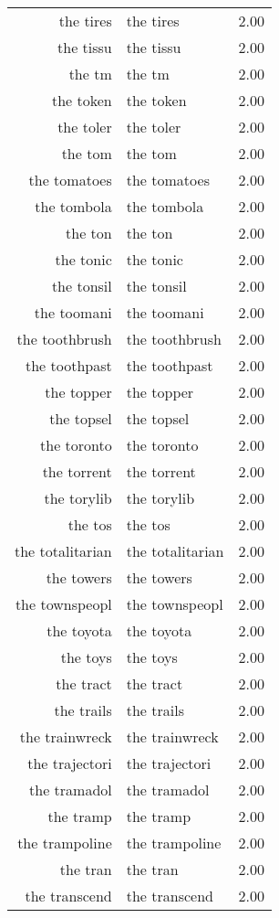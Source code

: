 \begin{table}[ht]
\begin{tabular}{rlr}
  the tires & the tires & 2.00 \\ 
  the tissu & the tissu & 2.00 \\ 
  the tm & the tm & 2.00 \\ 
  the token & the token & 2.00 \\ 
  the toler & the toler & 2.00 \\ 
  the tom & the tom & 2.00 \\ 
  the tomatoes & the tomatoes & 2.00 \\ 
  the tombola & the tombola & 2.00 \\ 
  the ton & the ton & 2.00 \\ 
  the tonic & the tonic & 2.00 \\ 
  the tonsil & the tonsil & 2.00 \\ 
  the toomani & the toomani & 2.00 \\ 
  the toothbrush & the toothbrush & 2.00 \\ 
  the toothpast & the toothpast & 2.00 \\ 
  the topper & the topper & 2.00 \\ 
  the topsel & the topsel & 2.00 \\ 
  the toronto & the toronto & 2.00 \\ 
  the torrent & the torrent & 2.00 \\ 
  the torylib & the torylib & 2.00 \\ 
  the tos & the tos & 2.00 \\ 
  the totalitarian & the totalitarian & 2.00 \\ 
  the towers & the towers & 2.00 \\ 
  the townspeopl & the townspeopl & 2.00 \\ 
  the toyota & the toyota & 2.00 \\ 
  the toys & the toys & 2.00 \\ 
  the tract & the tract & 2.00 \\ 
  the trails & the trails & 2.00 \\ 
  the trainwreck & the trainwreck & 2.00 \\ 
  the trajectori & the trajectori & 2.00 \\ 
  the tramadol & the tramadol & 2.00 \\ 
  the tramp & the tramp & 2.00 \\ 
  the trampoline & the trampoline & 2.00 \\ 
  the tran & the tran & 2.00 \\ 
  the transcend & the transcend & 2.00 \\ 

\end{tabular}
\end{table}
